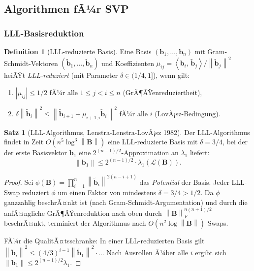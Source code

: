 ﻿\documentclass[a4paper,12pt]{article}
\theoremstyle{definition}
\newtheorem{definition}{Definition}
\newtheorem{satz}{Satz}
\newcommand{\Lat}{\mathcal{L}}
\newcommand{\B}{\mathbf{B}}
\newcommand{\norm}[1]{\left\|#1\right\|}
\newcommand{\innerprod}[2]{\left\langle #1,\, #2 \right\rangle}
\begin{document}
\subsection{Algorithmen fÃ¼r SVP}

\subsubsection{LLL-Basisreduktion}

\begin{definition}[LLL-reduzierte Basis]
Eine Basis $(\mathbf{b}_1, \ldots, \mathbf{b}_n)$ mit Gram-Schmidt-Vektoren
$(\tilde{\mathbf{b}}_1, \ldots, \tilde{\mathbf{b}}_n)$ und Koeffizienten
$\mu_{ij} = \innerprod{\mathbf{b}_i}{\tilde{\mathbf{b}}_j}/\norm{\tilde{\mathbf{b}}_j}^2$
heiÃŸt \emph{LLL-reduziert} (mit Parameter $\delta \in (1/4, 1]$), wenn gilt:
\begin{enumerate}
    \item $|\mu_{ij}| \leq 1/2$ fÃ¼r alle $1 \leq j < i \leq n$ \quad (GrÃ¶ÃŸenreduziertheit),
    \item $\delta \norm{\tilde{\mathbf{b}}_i}^2 \leq \norm{\tilde{\mathbf{b}}_{i+1} + \mu_{i+1,i} \tilde{\mathbf{b}}_i}^2$
          fÃ¼r alle $i$ \quad (LovÃ¡sz-Bedingung).
\end{enumerate}
\end{definition}

\begin{satz}[LLL-Algorithmus, Lenstra-Lenstra-LovÃ¡sz 1982]
\label{satz:lll}
Der LLL-Algorithmus findet in Zeit $O(n^5 \log^3 \norm{\B})$
eine LLL-reduzierte Basis mit $\delta = 3/4$, bei der der erste Basisvektor
$\mathbf{b}_1$ eine $2^{(n-1)/2}$-Approximation an $\lambda_1$ liefert:
\[
    \norm{\mathbf{b}_1} \leq 2^{(n-1)/2} \cdot \lambda_1(\Lat(\B)).
\]
\end{satz}

\begin{proof}
Sei $\phi(\B) = \prod_{i=1}^{n} \norm{\tilde{\mathbf{b}}_i}^{2(n-i+1)}$ das
\emph{Potential} der Basis.
Jeder LLL-Swap reduziert $\phi$ um einen Faktor von mindestens $\delta = 3/4 > 1/2$.
Da $\phi$ ganzzahlig beschrÃ¤nkt ist (nach Gram-Schmidt-Argumentation)
und durch die anfÃ¤ngliche GrÃ¶ÃŸenreduktion nach oben durch $\norm{\B}_F^{n(n+1)/2}$ beschrÃ¤nkt,
terminiert der Algorithmus nach $O(n^2 \log \norm{\B})$ Swaps.

FÃ¼r die QualitÃ¤tsschranke: In einer LLL-reduzierten Basis gilt
$\norm{\tilde{\mathbf{b}}_i}^2 \leq (4/3)^{i-1} \norm{\tilde{\mathbf{b}}_1}^2 \cdot \ldots$
Nach Ausrollen Ã¼ber alle $i$ ergibt sich $\norm{\mathbf{b}_1} \leq 2^{(n-1)/2} \lambda_1$.
\end{proof}
\end{document}

